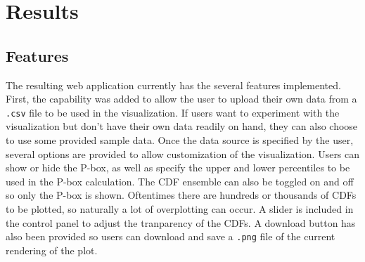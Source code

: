 \documentclass[11pt]{asaproc}\usepackage[]{graphicx}\usepackage[]{color}
\begin{document}

\section{Results}
\label{Results}

\subsection{Features}
The resulting web application currently has the several features implemented. First, the capability was added to allow the user to upload their own data from a {\tt .csv} file to be used in the visualization. If users want to experiment with the visualization but don't have their own data readily on hand, they can also choose to use some provided sample data.  Once the data source is specified by the user, several options are provided to allow customization of the visualization. Users can show or hide the P-box, as well as specify the upper and lower percentiles to be used in the P-box calculation. The CDF ensemble can also be toggled on and off so only the P-box is shown. Oftentimes there are hundreds or thousands of CDFs to be plotted, so naturally a lot of overplotting can occur. A slider is included in the control panel to adjust the tranparency of the CDFs. A download button has also been provided so users can download and save a {\tt .png} file of the current rendering of the plot. 

\end{document}
